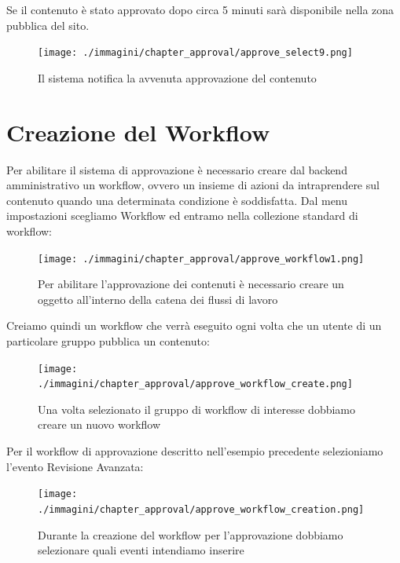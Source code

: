 Se il contenuto è stato approvato  dopo circa 5 minuti sarà disponibile nella zona pubblica del sito.
\begin{figure}[H]
 \centering
 \texttt{[image: ./immagini/chapter\_approval/approve\_select9.png]}
\caption{Il sistema notifica la avvenuta approvazione del contenuto} 
\label{fig:approve_select9}
\end{figure}

\section{Creazione del Workflow}

Per abilitare il sistema di approvazione è necessario creare dal backend amministrativo un workflow, ovvero un insieme di azioni da intraprendere sul contenuto quando una determinata condizione è soddisfatta. Dal menu impostazioni scegliamo Workflow ed entramo nella collezione standard di workflow:
\begin{figure}[H]
 \centering
 \texttt{[image: ./immagini/chapter\_approval/approve\_workflow1.png]}
 \caption{Per abilitare l'approvazione dei contenuti è necessario creare un oggetto all'interno della catena dei flussi di lavoro}
 \label{fig:approve_workflow2}
\end{figure}
Creiamo quindi un workflow che verrà eseguito ogni volta che un utente di un particolare gruppo pubblica un contenuto:

\begin{figure}[H]
 \centering
 \texttt{[image: ./immagini/chapter\_approval/approve\_workflow\_create.png]}
 \caption{Una volta selezionato il gruppo di workflow di interesse dobbiamo creare un nuovo workflow}
 \label{fig:approve_create}
\end{figure}
Per il workflow di approvazione descritto nell'esempio precedente selezioniamo l'evento Revisione Avanzata:

\begin{figure}[H]
 \centering
 \texttt{[image: ./immagini/chapter\_approval/approve\_workflow\_creation.png]}
 \caption{Durante la creazione del workflow per l'approvazione dobbiamo selezionare quali eventi intendiamo inserire}
 \label{fig:approve_create1}
\end{figure}

